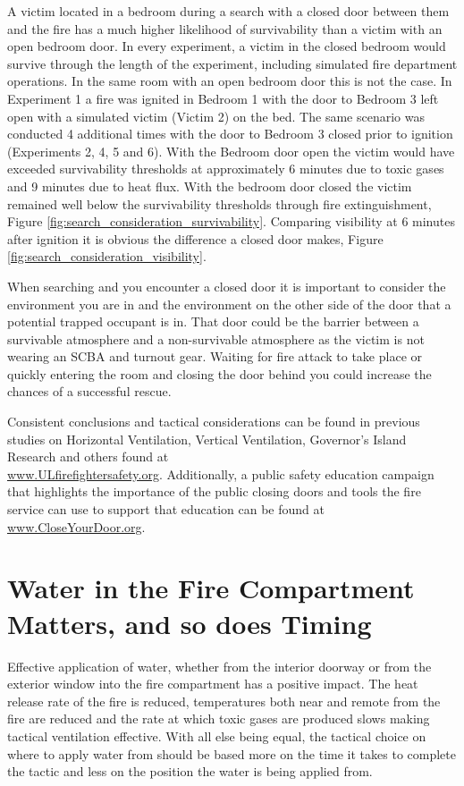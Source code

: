 \documentclass[12pt,oneside]{book}
\begin{document}
A victim located in a bedroom during a search with a closed door between them and the fire has a much higher likelihood of survivability than a victim with an open bedroom door.  In every experiment, a victim in the closed bedroom would survive through the length of the experiment, including simulated fire department operations.  In the same room with an open bedroom door this is not the case.  In Experiment 1 a fire was ignited in Bedroom 1 with the door to Bedroom 3 left open with a simulated victim (Victim 2) on the bed.  The same scenario was conducted 4 additional times with the door to Bedroom 3 closed prior to ignition (Experiments 2, 4, 5 and 6).   With the Bedroom door open the victim would have exceeded survivability thresholds at approximately 6 minutes due to toxic gases and 9 minutes due to heat flux.  With the bedroom door closed the victim remained well below the survivability thresholds through fire extinguishment, Figure \ref{fig:search_consideration_survivability}. Comparing visibility at 6 minutes after ignition it is obvious the difference a closed door makes, Figure \ref{fig:search_consideration_visibility}. 

When searching and you encounter a closed door it is important to consider the environment you are in and the environment on the other side of the door that a potential trapped occupant is in.  That door could be the barrier between a survivable atmosphere and a non-survivable atmosphere as the victim is not wearing an SCBA and turnout gear.  Waiting for fire attack to take place or quickly entering the room and closing the door behind you could increase the chances of a successful rescue.

Consistent conclusions and tactical considerations can be found in previous studies on Horizontal Ventilation, Vertical Ventilation,  Governor\textquoteright s Island Research and others found at \\
\href{www.ULfirefightersafety.org}{www.ULfirefightersafety.org}. Additionally, a public safety education campaign that highlights the importance of the public closing doors and tools the fire service can use to support that education can be found at \href{www.CloseYourDoor.org}{www.CloseYourDoor.org}.  

\section{Water in the Fire Compartment Matters, and so does Timing} \label{tc:water_in_compartment_and_time}
Effective application of water, whether from the interior doorway or from the exterior window into the fire compartment has a positive impact. The heat release rate of the fire is reduced, temperatures both near and remote from the fire are reduced and the rate at which toxic gases are produced slows making tactical ventilation effective. With all else being equal, the tactical choice on where to apply water from should be based more on the time it takes to complete the tactic and less on the position the water is being applied from.
\end{document}
